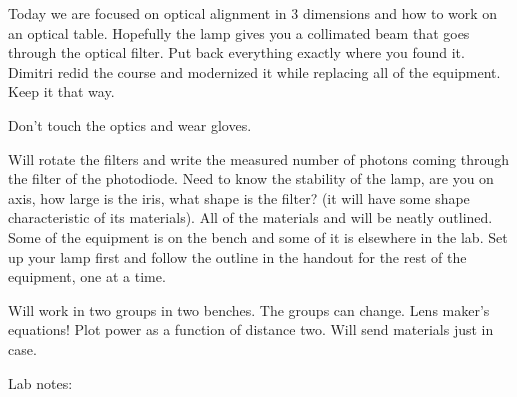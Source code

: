 \documentclass[11pt]{article}
\begin{document}
Today we are focused on optical alignment in 3 dimensions and how to
work on an optical table. Hopefully the lamp gives you a collimated beam
that goes through the optical filter. Put back everything exactly where
you found it. Dimitri redid the course and modernized it while replacing
all of the equipment. Keep it that way.

Don't touch the optics and wear gloves.

Will rotate the filters and write the measured number of photons coming
through the filter of the photodiode. Need to know the stability of the
lamp, are you on axis, how large is the iris, what shape is the filter?
(it will have some shape characteristic of its materials). All of the
materials and will be neatly outlined. Some of the equipment is on the
bench and some of it is elsewhere in the lab. Set up your lamp first and
follow the outline in the handout for the rest of the equipment, one at
a time.

Will work in two groups in two benches. The groups can change. Lens
maker's equations! Plot power as a function of distance two. Will send
materials just in case.

    Lab notes:
\end{document}
